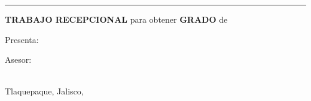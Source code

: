 \begin{titlepage}
\begin{fullwidth}
\begin{center}
        \textcolor{lightgray}{\noindent\rule{10cm}{0.2pt}}
        
        \vspace*{0.5cm}
        
        \Large
        \textcolor{itesodblue}{\textbf{TRABAJO RECEPCIONAL} para obtener \textbf{GRADO} de \\\textbf{\mydegree}}
        
        \vspace{1cm}
        
        \Large
        \textcolor{itesodblue}{Presenta: \\
        \textbf{\myauthor}}
        
        \vspace{1cm}
            
        \Large
        \textcolor{itesodblue}{
        Asesor:\\ 
        \textbf{\myadvisor}\\
        \textbf{\mycoadvisor}
        }
            
        \vspace{1cm}
        
        \vfill
        \large
        \textcolor{itesodblue}{Tlaquepaque, Jalisco, \mydate}
        
    \end{center}
\end{fullwidth}
\end{titlepage}
